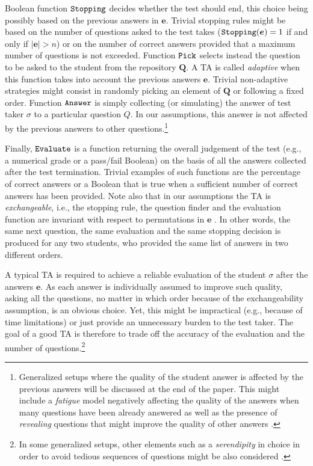 \documentclass[runningheads]{llncs}
\begin{document}
Boolean function ${\tt Stopping}$ decides whether the test should end, this choice being possibly based on the previous answers in $\bm{e}$. Trivial stopping rules might be based on the number of questions asked to the test takes (${\tt Stopping}(\bm{e})=1$ if and only if $|\bm{e}|>n$) or on the number of correct answers provided that a maximum number of questions is not exceeded. Function ${\tt Pick}$ selects instead the question to be asked to the student from the repository $\bm{Q}$. A TA is called \emph{adaptive} when this function takes into account the previous answers $\bm{e}$. Trivial non-adaptive strategies might consist in randomly picking an element of $\bm{Q}$ or following a fixed order. Function ${\tt Answer}$ is simply collecting (or simulating) the answer of test taker $\sigma$ to a particular question $Q$. In our assumptions, this answer is not affected by the previous answers to other questions.\footnote{Generalized setups where the quality of the student answer is affected by the previous answers will be discussed at the end of the paper. This might include a \emph{fatigue} model negatively affecting the quality of the answers when many questions have been already answered as well as the presence of \emph{revealing} questions that might improve the quality of other answers \cite{laitusis2007examination}.} 

Finally, ${\tt Evaluate}$ is a function returning the overall judgement of the test (e.g., a numerical grade or a pass/fail Boolean) on the basis of all the answers collected after the test termination. Trivial examples of such functions are the percentage of correct answers or a Boolean that is true when a sufficient number of correct answers has been provided. Note also that in our assumptions the TA is \emph{exchangeable}, i.e., the stopping rule, the question finder and the evaluation function are invariant with respect to permutations in $\bm{e}$ \cite{sawatzky2016accuracy}. In other words, the same next question, the same evaluation and the same stopping decision is produced for any two students, who provided the same list of answers in two different orders.

A typical TA is required to achieve a reliable evaluation of the student $\sigma$ after the answers $\bm{e}$. As each answer is individually assumed to improve such quality, asking all the questions, no matter in which  order because of the exchangeability assumption, is an obvious choice. Yet, this might be impractical (e.g., because of time limitations) or just provide an unnecessary burden to the test taker. The goal of a good TA is therefore to trade off the accuracy of the evaluation and the number of questions.\footnote{In some generalized setups, other elements such as a \emph{serendipity} in choice in order to avoid tedious sequences of questions might be also considered \cite{badran2019adaptive}.}
\end{document}
